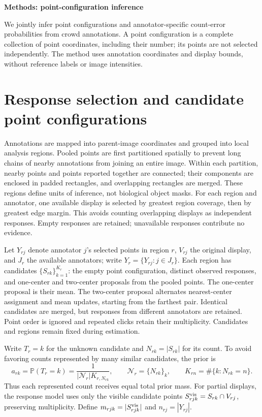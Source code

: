 \documentclass[a4paper,11pt]{article}
\newcommand{\Prob}{\mathbb{P}}
\begin{document}
\textbf{Methods: point-configuration inference}

We jointly infer point configurations and annotator-specific count-error
probabilities from crowd annotations. A point configuration is a complete
collection of point coordinates, including their number; its points are not
selected independently. The method uses annotation coordinates and display
bounds, without reference labels or image intensities.

\section*{Response selection and candidate point configurations}

Annotations are mapped into parent-image coordinates and grouped into local
analysis regions. Pooled points are first partitioned spatially to prevent
long chains of nearby annotations from joining an entire image. Within each
partition, nearby points and points reported together are connected; their
components are enclosed in padded rectangles, and overlapping rectangles are
merged. These regions define units of inference, not biological object masks.
For each region and annotator, one available display is selected by greatest
region coverage, then by greatest edge margin. This avoids counting
overlapping displays as independent responses. Empty responses are retained;
unavailable responses contribute no evidence.

Let $Y_{rj}$ denote annotator $j$'s selected points in region $r$, $V_{rj}$ the
original display, and $J_r$ the available annotators; write
$Y_r=\{Y_{rj}:j\in J_r\}$. Each region has candidates
$\{S_{rk}\}_{k=1}^{K_r}$: the empty point configuration, distinct observed
responses, and one-center and two-center proposals from the pooled points.
The one-center proposal is their mean. The two-center proposal alternates
nearest-center assignment and mean updates, starting from the farthest pair.
Identical candidates are merged, but responses from different annotators are
retained. Point order is ignored and repeated clicks retain their multiplicity.
Candidates and regions remain fixed during estimation.

Write $T_r=k$ for the unknown candidate and $N_{rk}=|S_{rk}|$ for its count.
To avoid favoring counts represented by many similar candidates, the prior is
\begin{equation}
 a_{rk}=\Prob(T_r=k)=\frac{1}{|\mathcal N_r|K_{r,N_{rk}}},
 \qquad \mathcal N_r=\{N_{rk}\}_k,\qquad
 K_{rn}=\#\{k:N_{rk}=n\}.
 \label{eq:prior-config}
\end{equation}
Thus each represented count receives equal total prior mass. For partial
displays, the response model uses only the visible candidate points
$S_{rjk}^{\rm vis}=S_{rk}\cap V_{rj}$, preserving multiplicity. Define
$m_{rjk}=|S_{rjk}^{\rm vis}|$ and $n_{rj}=|Y_{rj}|$.
\end{document}
